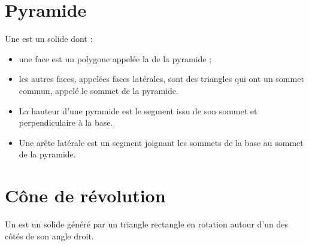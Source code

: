 


\section{Pyramide}

\begin{definition}
    Une  est un solide dont :
    \begin{itemize}
        \item 
            une face est un polygone appelée la  de la pyramide ;
\item
les autres faces, appelées faces latérales, sont des triangles qui ont un sommet commun, appelé le sommet de la pyramide.
    \end{itemize}
\end{definition}


\begin{definition}
    \begin{itemize}
        \item 
La hauteur d'une pyramide est le segment issu de son sommet et perpendiculaire à la base.
\item
Une arête latérale est un segment joignant les sommets de la base au sommet de la pyramide.
    \end{itemize}
\end{definition}



\section{Cône de révolution}

\begin{definition}
    Un  est un solide généré par un triangle rectangle en rotation autour d'un des côtés de son angle droit.
\end{definition}




